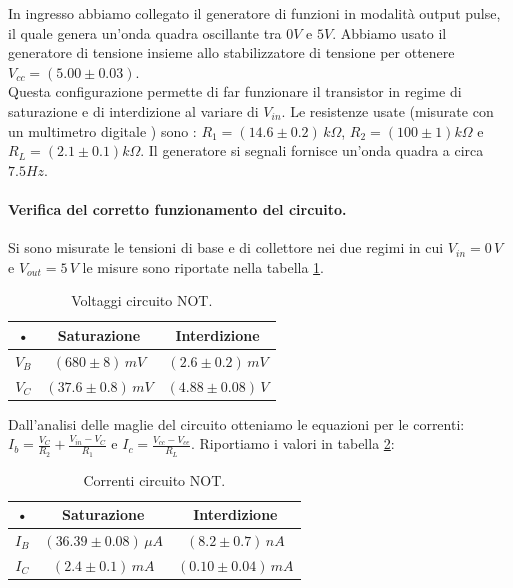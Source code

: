 \documentclass[10pt,a4paper]{article}
\begin{document}
In ingresso abbiamo collegato  il generatore di funzioni in modalità output pulse, il quale genera un’onda quadra oscillante tra $0 V$ e $5 V$. Abbiamo usato  il generatore di tensione insieme allo stabilizzatore di tensione per ottenere  $V_{cc} = (5.00 \pm 0.03)$. \\ 
Questa configurazione permette di far funzionare il transistor in regime di saturazione e di interdizione al variare di $V_{in}$. Le resistenze usate (misurate con un multimetro digitale ) sono : $R_1=(14.6 \pm 0.2) \, k\Omega$, $R_2=(100 \pm 1) k\Omega$ e $R_L=(2.1 \pm 0.1) k\Omega$.
Il generatore si segnali fornisce un'onda quadra a circa $7.5 Hz$.

\paragraph{Verifica del corretto funzionamento del circuito.}
Si sono misurate le tensioni di base e di collettore nei due regimi in cui $V_{in} = 0 \, V$ e $V_{out} = 5 \, V$ le misure sono riportate nella tabella \ref{voltNot}.

\begin{table}[!htb]\centering
\begin{tabular}{|c|c|c|}
\hline 
• & Saturazione & Interdizione \\ 
\hline 
$V_{B}$ & $(680\pm8)\,mV$  & $(2.6\pm0.2)\,mV$ \\ 
\hline 
$V_{C}$ & $(37.6\pm0.8)\,mV$ & $(4.88\pm0.08)\,V$ \\ 
\hline 
\end{tabular}
\caption{Voltaggi circuito NOT.} \label{voltNot}
\end{table}

Dall'analisi delle maglie del circuito otteniamo le equazioni per le correnti: $I_{b} = \frac{V_{C}}{R_2} + \frac{V_{in}-V_{C}}{R_1}$ e $I_c = \frac{V_{cc}-V_{ce}}{R_L}$. Riportiamo i valori in tabella \ref{correntiNot}:

\begin{table}[!htb]\centering
\begin{tabular}{|c|c|c|}
\hline 
• & Saturazione & Interdizione \\ 
\hline 
$I_B$ & $(36.39\pm0.08) \, \mu A$ & $(8.2 \pm 0.7) \, nA$ \\ 
\hline 
$I_C$ & $(2.4 \pm 0.1)\, mA$ & $(0.10\pm0.04) \, mA$ \\ 
\hline 
\end{tabular} 
\caption{Correnti circuito NOT.} \label{correntiNot}
\end{table}
\end{document}
